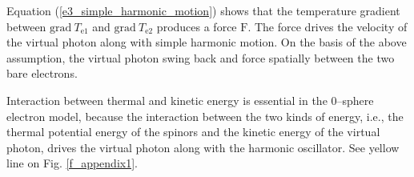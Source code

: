 \documentclass[%
 reprint,
 amsmath,amssymb,
 aps,
]{revtex4-1}
\numberwithin{equation}{section}%
\begin{document}
    Equation (\ref{e3_simple_harmonic_motion}) shows that the temperature gradient between $\mathrm{grad} \ T_{\mathrm{e1}}$ and $\mathrm{grad} \ T_{\mathrm{e2}}$ produces a force $\bm{\mathrm{F}}$. The force drives the velocity of the virtual photon along with simple harmonic motion. On the basis of the above assumption, the virtual photon swing back and force spatially between the two bare electrons.
    
    Interaction between thermal and kinetic energy is essential in the 0--sphere electron model, because the interaction between the two kinds of energy, i.e., the thermal potential energy of the spinors and the kinetic energy of the virtual photon, drives the virtual photon along with the harmonic oscillator. See yellow line on Fig. \ref{f_appendix1}.


\end{document}
